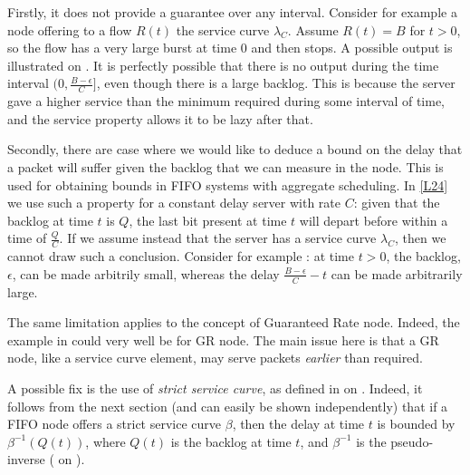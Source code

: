 Firstly, it does not provide a guarantee over any interval.
Consider for example a node offering to a flow $R(t)$ the service
curve $\lambda_C$. Assume $R(t)=B$ for $t>0$, so the flow has a
very large burst at time $0$ and then stops. A possible output is
illustrated on . It is perfectly possible that
there is no output during the time interval $(0,
\frac{B-\epsilon}{C}]$, even though there is a large backlog. This
is because the server gave a higher service than the minimum
required during some interval of time, and the service property
allows it to be lazy after that.
\begin{figure}[!htbp]
\end{figure}


Secondly, there are case where we would like to deduce a bound on
the delay that a packet will suffer given the backlog that we can
measure in the node. This is used for obtaining bounds in FIFO
systems with aggregate scheduling. In \cref{L24} we use such a
property for a constant delay server with rate $C$: given that the
backlog at time $t$ is $Q$, the last bit present at time $t$ will
depart before within a time of $\frac{Q}{C}$. If we assume instead
that the server has a service curve $\lambda_C$, then we cannot
draw such a conclusion. Consider for example :
at time $t >0$, the backlog, $\epsilon$, can be made arbitrily
small, whereas the delay $\frac{B - \epsilon}{C}-t$ can be made
arbitrarily large.

The same limitation applies to the concept of Guaranteed Rate
node. Indeed, the example in  could very
well be for GR node. The main issue here is that a GR node,
like a service curve element, may serve packets \emph{earlier}
than required.

A possible fix is the use of \emph{strict service curve}, as
defined in  on . Indeed, it follows
from the next section (and can easily be shown independently) that
if a FIFO node offers a strict service curve $\beta$, then the
delay at time $t$ is bounded by $\beta^{-1}(Q(t))$, where $Q(t)$
is the backlog at time $t$, and $\beta^{-1}$ is the pseudo-inverse
( on ).

